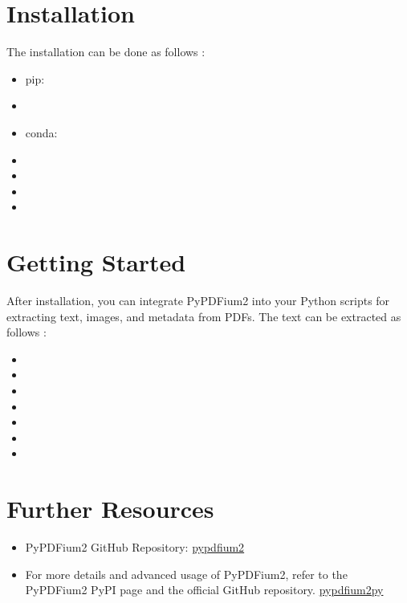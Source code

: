 \section{Installation}

The installation can be done as follows \cite{pypdfium2:2024}: 
\begin{itemize}
    \item pip: 
    \item[] 
    \item conda: 
    \item[] 
    \item[] 
    \item[] 
    \item[] 
\end{itemize}

\section{Getting Started}

After installation, you can integrate PyPDFium2 into your Python scripts for extracting text, images, and metadata from PDFs. The text can be extracted as follows \cite{pypdfium2:2024}: 
\begin{itemize}
    \item[] 
    \item[] 
    \item[] 
    \item[] 
    \item[] 
    \item[] 
    \item[] 
\end{itemize}

\section{Further Resources}

\begin{itemize}
    \item PyPDFium2 GitHub Repository: \href{https://github.com/pypdfium2-team/pypdfium2}{pypdfium2}
    \item For more details and advanced usage of PyPDFium2, refer to the PyPDFium2 PyPI page and the official GitHub repository. \href{https://pypi.org/project/pypdfium2/}{pypdfium2py}
\end{itemize}
